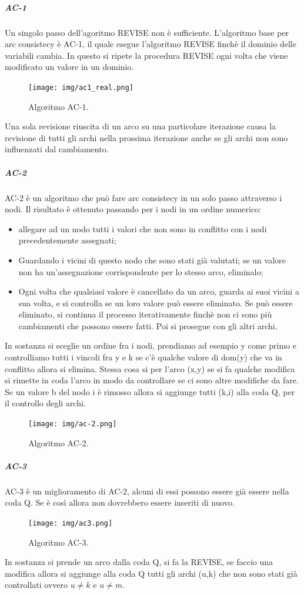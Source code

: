 \subparagraph{AC-1} Un singolo passo dell'agoritmo REVISE non è sufficiente. L'algoritmo base per arc consistecy è AC-1, il quale esegue l'algoritmo REVISE finchè il dominio delle variabili cambia. In questo si ripete la procedura REVISE ogni volta che viene modificato un valore in un dominio.
\begin{figure}[H]
    \centering
    \texttt{[image: img/ac1\_real.png]}
    \caption{Algoritmo AC-1.}\label{fig:ac1}
\end{figure}
Una sola revisione riuscita di un arco su una particolare iterazione causa la revisione di tutti gli archi nella prossima iterazione anche se gli archi non sono influenzati dal cambiamento.

\subparagraph{AC-2}
AC-2 è un algoritmo che può fare arc consistecy in un solo passo attraverso i nodi. Il risultato è ottenuto passando per i nodi in un ordine numerico:
\begin{itemize}
    \item allegare ad un nodo tutti i valori che non sono in conflitto con i nodi precedentemente assegnati;
    \item Guardando i vicini di questo nodo che sono stati già valutati; se un valore non ha un'assegnazione corrispondente per lo stesso arco, eliminalo;
    \item Ogni volta che qualsiasi valore è cancellato da un arco, guarda ai suoi vicini a sua volta, e si controlla se un loro valore può essere eliminato. Se può essere eliminato, si continua il processo iterativamente finchè non ci sono più cambiamenti che possono essere fatti. Poi si prosegue con gli altri archi.
\end{itemize}
In sostanza si sceglie un ordine fra i nodi, prendiamo ad esempio y come primo e controlliamo tutti i vincoli fra y e k se c'è qualche valore di dom(y) che va in conflitto allora si elimina. Stessa cosa si per l'arco (x,y) se si fa qualche modifica si rimette in coda l'arco in modo da controllare se ci sono altre modifiche da fare. Se un valore b del nodo i è rimosso allora si aggiunge tutti (k,i) alla coda Q, per il controllo degli archi.
\begin{figure}[H]
    \centering
    \texttt{[image: img/ac-2.png]}
    \caption{Algoritmo AC-2.}\label{fig:ac2}
\end{figure}

\subparagraph{AC-3}
AC-3 è un miglioramento di AC-2, alcuni di essi possono essere già essere nella coda Q. Se è così allora non dovrebbero essere inseriti di nuovo. 
\begin{figure}[H]
    \centering
    \texttt{[image: img/ac3.png]}
    \caption{Algoritmo AC-3.}\label{fig:ac3}
\end{figure}
In sostanza si prende un arco dalla coda Q, si fa la REVISE, se faccio una modifica allora si aggiunge alla coda Q tutti gli archi (u,k) che non sono stati già controllati ovvero $u \neq k$ e $u\neq m$.
